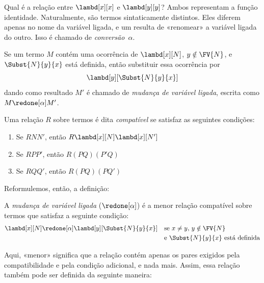 \documentclass[../../../include/open-logic-section]{subfiles}
\begin{document}

Qual é a relação entre $\lambd[x][x]$ e $\lambd[y][y]$? Ambos representam a
função identidade. Naturalmente, são termos sintaticamente distintos. Eles
diferem apenas no nome da variável ligada, e um resulta de «renomear» a
variável ligada do outro. Isso é chamado de \emph{conversão~$\alpha$}.

\begin{defn}
  Se um termo $M$ contém uma ocorrência de $\lambd[x][N]$, $y \notin
  \FV{N}$, e $\Subst{N}{y}{x}$ está definida, então substituir essa ocorrência
  por
  \begin{equation*}
    \lambd[y][\Subst{N}{y}{x}]
  \end{equation*}
  dando como resultado $M'$ é chamado de \emph{mudança de variável ligada},
  escrita como $M \redone[\alpha] M'$.
\end{defn}

\begin{defn}
  Uma relação $R$ sobre termos é dita \emph{compatível} se satisfaz as
  seguintes condições:
  \begin{enumerate}
  \item Se $R N N'$, então $R \lambd[x][N] \lambd[x][N']$
  \item Se $R P P'$, então $R (PQ) (P'Q)$
  \item Se $R Q Q'$, então $R (PQ) (PQ')$
  \end{enumerate}
\end{defn}

Reformulemos, então, a definição:
\begin{defn}
  A \emph{mudança de variável ligada} ($\redone[\alpha]$) é a menor relação
  compatível sobre termos que satisfaz a seguinte condição:
  \begin{align*}
    &\lambd[x][N] \redone[\alpha] \lambd[y][\Subst{N}{y}{x}] && \text{se
      $x \neq y$, $y \notin \FV{N}$} \\
    & &&\text{e $\Subst{N}{y}{x}$ está definida}
  \end{align*}
\end{defn}

Aqui, «menor» significa que a relação contém apenas os pares exigidos pela
compatibilidade e pela condição adicional, e nada mais. Assim, essa relação
também pode ser definida da seguinte maneira:
\end{document}
